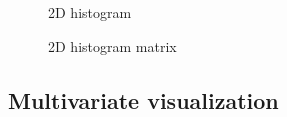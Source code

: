 \documentclass[article]{jss}
\begin{document}
\begin{figure}[htbp]
\centering
{}
\caption{\label{fig:2Dhist} 2D histogram }
\end{figure}


\begin{figure}[htbp]
\centering
{}
\caption{\label{fig:2DhistMatrix} 2D histogram matrix}
\end{figure}


\subsection{Multivariate visualization}
\end{document}
